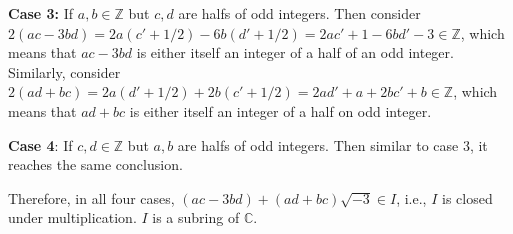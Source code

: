 \documentclass[12pt]{article}
\begin{document}
\begin{fproof}[Jacobson 2.1.4]
  \textbf{Case 3:} If \(a,b \in \mathbb{Z}\) but \(c,d\) are halfs of odd integers.
  Then consider \(2(ac - 3bd) = 2a(c' + 1/2) -6b(d'+1/2) = 2ac' + 1 - 6bd' - 3 \in \mathbb{Z}\), which means that \(ac - 3bd\) is either itself an integer of a half of an odd integer.
  Similarly, consider \(2(ad+bc) = 2a(d'+1/2) + 2b(c'+1/2) = 2ad'+a + 2bc' + b \in \mathbb{Z}\), which means that \(ad + bc\) is either itself an integer of a half on odd integer.

  \textbf{Case 4}: If \(c,d \in \mathbb{Z}\) but \(a,b\) are halfs of odd integers. Then similar to case 3, it reaches the same conclusion.

  Therefore, in all four cases, \((ac - 3bd) + (ad + bc) \sqrt{-3} \in I\), i.e., \(I\) is closed under multiplication.
  \(I\) is a subring of \(\mathbb{C}\).


\end{fproof}

\newpage

\begin{fproof}[Jacobson 2.2.1]
  
\end{fproof}

\newpage

\begin{fproof}[Jacobson 2.2.4]
\end{fproof}

\newpage

\begin{fproof}[Jacobson 2.2.6]
\end{fproof}

\newpage

\begin{fproof}[Jacobson 2.2.7]
\end{fproof}
\end{document}
